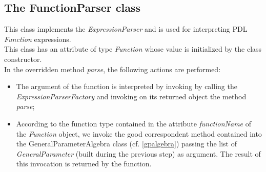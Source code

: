 \documentclass[a4paper,11pt] {ivoa}
\begin{document}
\subsection{The FunctionParser class}
This class implements the {\it ExpressionParser} and is used for interpreting PDL {\it Function} expressions.\\
This class has an attribute of type {\it Function} whose value is initialized by the class constructor.\\
In the overridden method {\it parse}, the following actions are performed:
\begin{itemize}
\item The argument of the function is interpreted by invoking by calling the {\it ExpressionParserFactory} and invoking on its returned object the method {\it parse};
\item According to the function type contained in the attribute {\it functionName} of the {\it Function} object, we invoke the good correspondent method contained into the {GeneralParameterAlgebra} class (cf. \ref{gpalgebra})  passing the list of {\it GeneralParameter} (built during the previous step) as argument. The result of this invocation is returned by the function.
\end{itemize}
\end{document}
